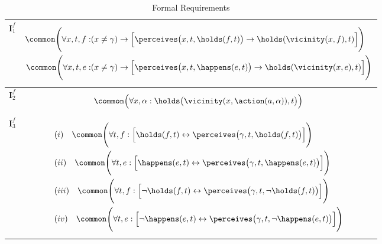 \begin{table}
\begin{small}
\begin{center}
\begin{tabular}{lp{12cm}}
$\mathbf{I}^f_1$ &
 \begin{equation*} \begin{aligned}
            \common\Bigg(\forall x, t, f:& (x \not = \gamma) \rightarrow \Big[\perceives\big(x, t, \holds(f, t)\big) \rightarrow
            \holds(\vicinity(x, f), t)\Big]\Bigg)\\
            \common\Bigg(\forall x, t, e:& (x \not = \gamma) \rightarrow \Big[\perceives\big(x, t, \happens(e, t)\big) \rightarrow
            \holds(\vicinity(x, e), t)\Big]\Bigg)\\
          \end{aligned}\end{equation*}
\\
\midrule

$\mathbf{I}^f_2$ &         \begin{equation*}
          \common\Big(\forall x, \alpha:  \holds\big(\vicinity(x, \action(a, \alpha)), t\big)\Big)
        \end{equation*}
\\
\midrule

$\mathbf{I}^f_3$ &         \begin{equation*}
          \begin{aligned}
       &  (i) \hspace{10pt}  \common\Bigg(\forall  t, f:  \Big[\holds(f, t) \leftrightarrow \perceives\big(\gamma, t, \holds(f, t)\big) \Big]\Bigg)\\
       & (ii)  \hspace{10pt}   \common\Bigg(\forall  t, e: \Big[\happens(e, t)
            \leftrightarrow \perceives\big(\gamma, t, \happens(e,
            t)\big) \Big]\Bigg)\\
        &   (iii)  \hspace{10pt}   \common\Bigg(\forall  t, f:  \Big[\lnot \holds(f, t)
            \leftrightarrow \perceives\big(\gamma, t, \lnot \holds(f, t)\big) \Big]\Bigg)\\
        &   (iv) \hspace{10pt}    \common\Bigg(\forall  t, e:\Big[\lnot \happens(e, t)
            \leftrightarrow \perceives\big(\gamma, t, \lnot \happens(e, t)\big) \Big]\Bigg)
          \end{aligned}
        \end{equation*}
\\
\bottomrule
\end{tabular}
\caption{Formal Requirements}
\label{formalreqs}
\end{center}
\end{small}
\end{table}


